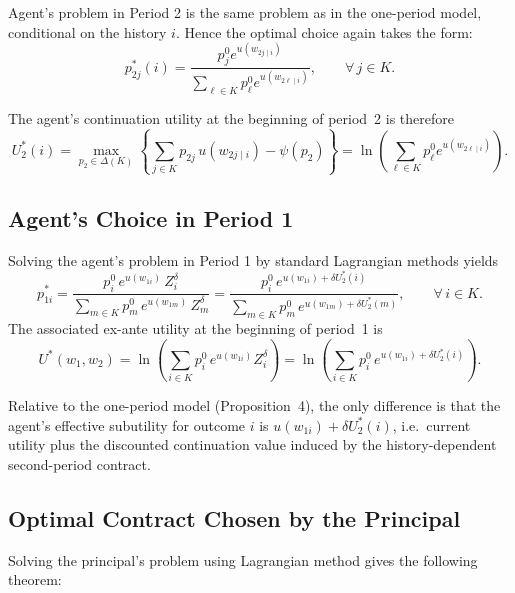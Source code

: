 \documentclass[12pt]{article}
\theoremstyle{definition}
\begin{document}
Agent's problem in Period 2 is the same problem as in the one-period model, conditional on the history \(i\). Hence the optimal choice again takes the form:
\begin{equation}\label{eq:p2j}
p_{2j}^*(i)
=
\frac{p_j^0 e^{u(w_{2j\mid i})}}{\sum_{\ell\in K}p_\ell^0 e^{u(w_{2\ell\mid i})}},
\qquad \forall\, j\in K.
\end{equation}

The agent’s continuation utility at the beginning of period~2 is therefore
\begin{equation}\label{eq:u2_agent}
U_2^*(i)
=
\max_{p_2\in\Delta(K)}\left\{\sum_{j\in K} p_{2j}\,u(w_{2j\mid i})-\psi(p_2)\right\}
=
\ln\!\left(\sum_{\ell\in K}p_\ell^0 e^{u(w_{2\ell\mid i})}\right).
\end{equation}

\subsection{Agent's Choice in Period 1}

Solving the agent’s problem in Period 1 by standard Lagrangian methods yields
\begin{equation}\label{eq:p2i}
p_{1i}^*
=
\frac{p_i^0\,e^{u(w_{1i})}\,Z_i^{\delta}}
{\sum_{m\in K}p_m^0\,e^{u(w_{1m})}\,Z_m^{\delta}}
=
\frac{p_i^0\,e^{u(w_{1i})+\delta U_2^*(i)}}
{\sum_{m\in K}p_m^0\,e^{u(w_{1m})+\delta U_2^*(m)}},
\qquad \forall\, i\in K.
\end{equation}
The associated ex-ante utility at the beginning of period~1 is
\begin{equation}\label{eq:u1_agent}
U^*(w_1,w_2)
=
\ln\!\left(\sum_{i\in K}p_i^0\,e^{u(w_{1i})}Z_i^{\delta}\right)
=
\ln\!\left(\sum_{i\in K}p_i^0\,e^{u(w_{1i})+\delta U_2^*(i)}\right).
\end{equation}

Relative to the one-period model (Proposition~4), the only difference is that the agent’s effective subutility for outcome \(i\) is \(u(w_{1i})+\delta U_2^*(i)\), i.e.\ current 
utility plus the discounted continuation value induced by the history-dependent second-period contract.

\subsection{Optimal Contract Chosen by the Principal}

Solving the principal's problem using Lagrangian method gives the following theorem:
\end{document}
